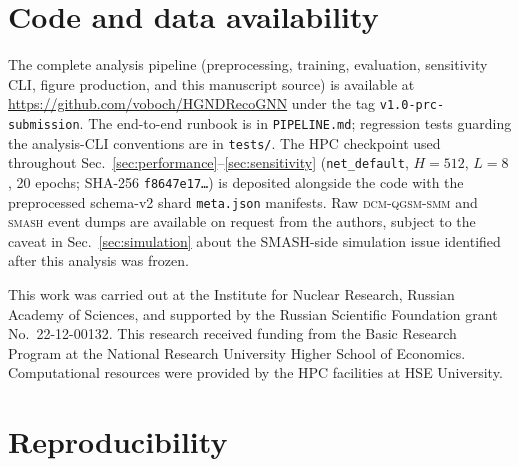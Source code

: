 \documentclass[aps,prc,twocolumn,superscriptaddress,showpacs,%
               nofootinbib,floatfix,longbibliography]{revtex4-2}
\newcommand{\SMASH}{\textsc{smash}}
\newcommand{\DCM}{\textsc{dcm-qgsm-smm}}
\begin{document}
\section*{Code and data availability}
\label{sec:availability}

The complete analysis pipeline (preprocessing, training, evaluation,
sensitivity CLI, figure production, and this manuscript source) is
available at \url{https://github.com/voboch/HGNDRecoGNN} under the
tag \texttt{v1.0-prc-submission}.  The end-to-end runbook is in
\texttt{PIPELINE.md}; regression tests guarding the analysis-CLI
conventions are in \texttt{tests/}.  The HPC checkpoint used
throughout Sec.~\ref{sec:performance}--\ref{sec:sensitivity}
(\texttt{net\_default}, $H=512$, $L=8$, 20 epochs; SHA-256
\texttt{f8647e17\dots}) is deposited alongside the code with the
preprocessed schema-v2 shard \texttt{meta.json} manifests.
Raw \DCM{} and \SMASH{} event dumps are available on request from
the authors, subject to the caveat in Sec.~\ref{sec:simulation} about
the SMASH-side simulation issue identified after this analysis was
frozen.

\begin{acknowledgments}
This work was carried out at the Institute for Nuclear Research,
Russian Academy of Sciences, and supported by the Russian Scientific
Foundation grant No.~22-12-00132.  This research received funding from
the Basic Research Program at the National Research University Higher
School of Economics.  Computational resources were provided by the
HPC facilities at HSE University.
\end{acknowledgments}

\appendix
\section{Reproducibility}
\label{sec:reproducibility}
\end{document}
